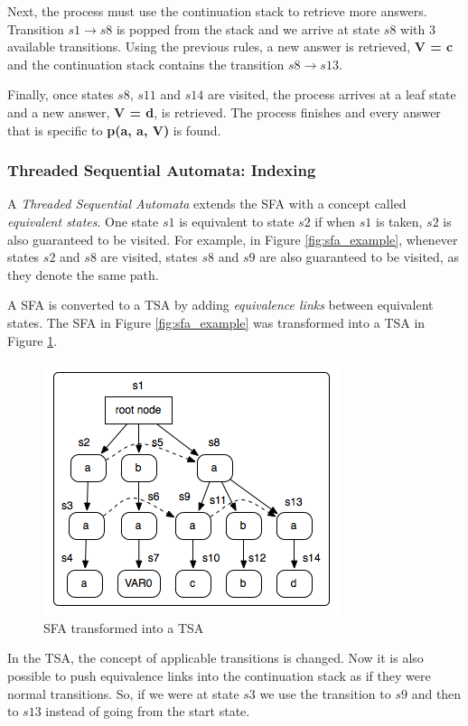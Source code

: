   Next, the process must use the continuation stack to retrieve more answers. Transition $s1 \rightarrow s8$ is popped from the stack
  and we arrive at state $s8$ with 3 available transitions. Using the previous rules, a new answer is retrieved,
  \textbf{V = c} and the continuation stack contains the transition $s8 \rightarrow s13$.
  
  Finally, once states $s8$, $s11$ and $s14$ are visited, the process arrives at a leaf state and a new answer, \textbf{V = d}, is retrieved.
  The process finishes and every answer that is specific to \textbf{p(a, a, V)} is found.
  
  \subsubsection{Threaded Sequential Automata: Indexing}
  
  A \textit{Threaded Sequential Automata} extends the SFA with a concept called
  \textit{equivalent states}. One state $s1$ is equivalent to state $s2$ if when $s1$ is taken, $s2$ is also
  guaranteed to be visited. For example, in Figure \ref{fig:sfa_example}, whenever states $s2$ and $s8$ are
  visited, states $s8$ and $s9$ are also guaranteed to be visited, as they denote the same path.
  
  A SFA is converted to a TSA by adding \textit{equivalence links} between equivalent states.
  The SFA in Figure \ref{fig:sfa_example} was transformed into a TSA in Figure \ref{fig:tsa_example}.
  
  \begin{figure}[ht]
    \centering
      \includegraphics[scale=0.6]{tsa.png}
    \caption{SFA transformed into a TSA}
    \label{fig:tsa_example}
  \end{figure}
  
  In the TSA, the concept of applicable transitions is changed. Now it is also possible to push equivalence links
  into the continuation stack as if they were normal transitions. So, if we were at state $s3$ we use
  the transition to $s9$ and then to $s13$ instead of going from the start state.
  
